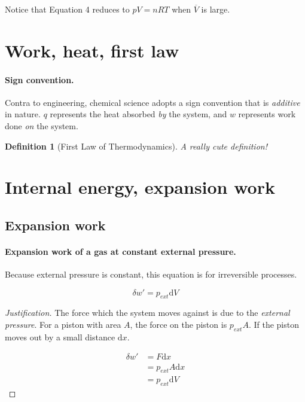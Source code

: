 \documentclass{article}
\numberwithin{theorem}{section}
\numberwithin{corollary}{section}
\numberwithin{postulate}{section}
\numberwithin{lemma}{section}
\newtheorem{definition}{Definition}
\numberwithin{definition}{section}
\newenvironment{justification} {\begin{proof}[Justification]} {\end{proof}}
\begin{document}
Notice that Equation 4 reduces to $pV = nRT$ when $\overline{V}$ is large.

\section{Work, heat, first law}

\paragraph{Sign convention. }Contra to engineering, chemical science adopts
a sign convention that is \textit{additive} in nature. $q$ represents the heat
absorbed \textit{by} the system, and $w$ represents work done \textit{on} the
system.


\begin{definition}[First Law of Thermodynamics]
A really cute definition!
\end{definition}

\section{Internal energy, expansion work}

\subsection{Expansion work} 

\paragraph{Expansion work of a gas at constant external pressure.} Because
external pressure is constant, this equation is for irreversible processes.

\begin{equation}
  \delta w' = p_{ext} \mathrm{d}V
\end{equation}

\begin{justification}
  The force which the system moves against is due to the \textit{external
  pressure}. For a piston with area $A$, the force on the piston is $p_{ext}A$. If the
  piston moves out by a small distance $\mathrm{d}x$.

  \begin{equation*}
  \begin{split}
    \delta w' & = F\mathrm{d}x \\
    & =  p_{ext} A \mathrm{d}x \\
    & = p_{ext} \mathrm{d}V
  \end{split}
\end{equation*}

\end{justification}
\end{document}
